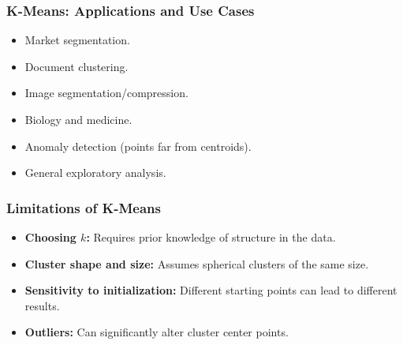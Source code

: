 \documentclass[aspectratio=169]{beamer}
\begin{document}

\begin{frame}
    \frametitle{K-Means: Applications and Use Cases}
    \begin{itemize}
        \item Market segmentation.
        \item Document clustering.
        \item Image segmentation/compression.
        \item Biology and medicine.
        \item Anomaly detection (points far from centroids).
        \item General exploratory analysis.
    \end{itemize}
    \end{frame}

\begin{frame}
    \frametitle{Limitations of K-Means}
    \begin{itemize}
    \item \textbf{Choosing $k$:} Requires prior knowledge of structure in the data.
    \item \textbf{Cluster shape and size:} Assumes spherical clusters of the same size.
    \item \textbf{Sensitivity to initialization:} Different starting points can lead to different results.
    \item \textbf{Outliers:} Can significantly alter cluster center points.
    \end{itemize}
    \end{frame}
\end{document}

